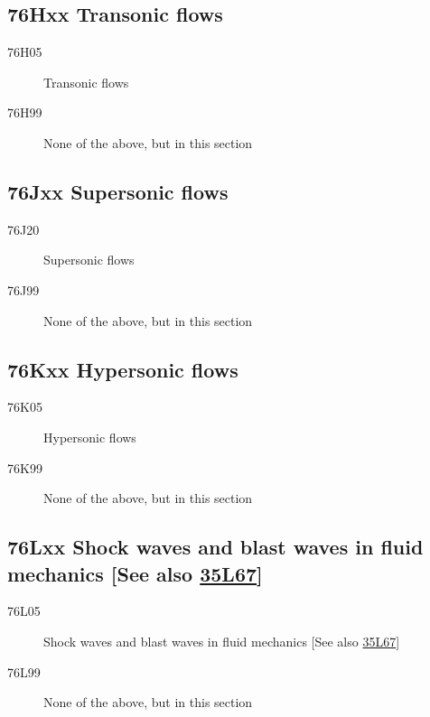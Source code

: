 \subsection*{76Hxx  Transonic flows }\label{76Hxx}
\begin{description}  
\item [76H05]\label{76H05} Transonic flows
\item [76H99]\label{76H99} None of the above, but in this section
\end{description}
\subsection*{76Jxx  Supersonic flows }\label{76Jxx}
\begin{description}  
\item [76J20]\label{76J20} Supersonic flows
\item [76J99]\label{76J99} None of the above, but in this section
\end{description}
\subsection*{76Kxx  Hypersonic flows }\label{76Kxx}
\begin{description}  
\item [76K05]\label{76K05} Hypersonic flows
\item [76K99]\label{76K99} None of the above, but in this section
\end{description}
\subsection*{76Lxx  Shock waves and blast waves in fluid mechanics [See also \hyperref[35L67]{35L67}] }\label{76Lxx}
\begin{description}  
\item [76L05]\label{76L05} Shock waves and blast waves in fluid mechanics  [See also \hyperref[35L67]{35L67}]
\item [76L99]\label{76L99} None of the above, but in this section
\end{description}
